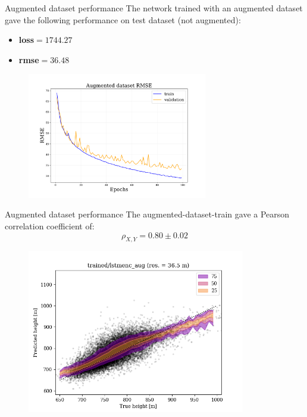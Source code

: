 \documentclass{beamer}
\begin{document}
\begin{frame}{Augmented dataset performance}
    The network trained with an augmented dataset gave the following performance on test dataset (not augmented):
    \begin{itemize}
        \item[\textbullet] \textbf{loss}$=1744.27$
        \item[\textbullet] \textbf{rmse}$=36.48$
    \end{itemize}

        \begin{figure}
            \centering
            \includegraphics[width=0.7\textwidth]{figures/lstmenc_aug_rmse.pdf}
        \end{figure}

\end{frame}

\begin{frame}{Augmented dataset performance}
    The augmented-dataset-train gave a Pearson correlation coefficient of:
    \begin{equation*}
        \rho_{X,Y} = 0.80 \pm 0.02
    \end{equation*}

        \begin{figure}
            \centering
            \includegraphics[width=0.85\textwidth]{figures/augmented_train.png}
        \end{figure}

\end{frame}
\end{document}
